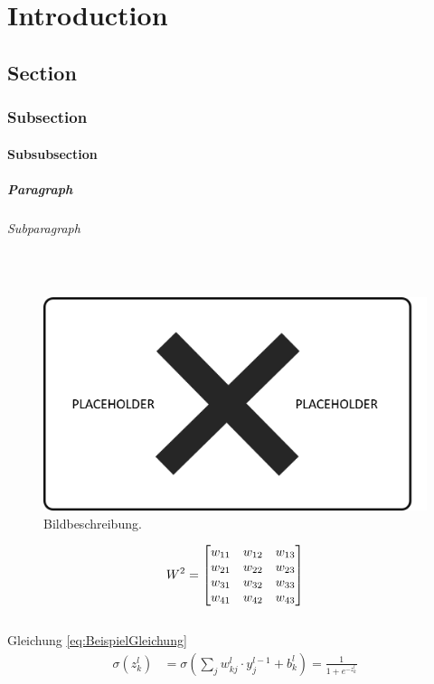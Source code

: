 \chapter{Introduction}
\label{ch:Introduction}

\section{Section}
\subsection{Subsection}
\subsubsection{Subsubsection}
\paragraph{Paragraph}
\subparagraph{Subparagraph}\mbox{}\\

\begin{figure}[H]
\centering
\includegraphics[width=\linewidth]{images/Placeholder}
\caption{Bildbeschreibung.}
\label{img:Placeholder}
\end{figure} 

\begin{align}
\label{eq:MatrixBeispiel}
W^2 = \begin{bmatrix}
w_{11} & w_{12} & w_{13} \cr
w_{21} & w_{22} & w_{23} \cr
w_{31} & w_{32} & w_{33} \cr
w_{41} & w_{42} & w_{43}
\end{bmatrix}
\end{align}\mbox{}\\
Gleichung \ref{eq:BeispielGleichung}
\begin{align}
\sigma\left(z^l_k\right) &= \sigma\left(\sum_{j}{w_{kj}^l\cdot y_j^{l-1}+b_k^l}\right)=\frac{1}{1+e^{-z^l_k}}
\label{eq:BeispielGleichung}
\end{align}\mbox{}\\


\newpage
{}
